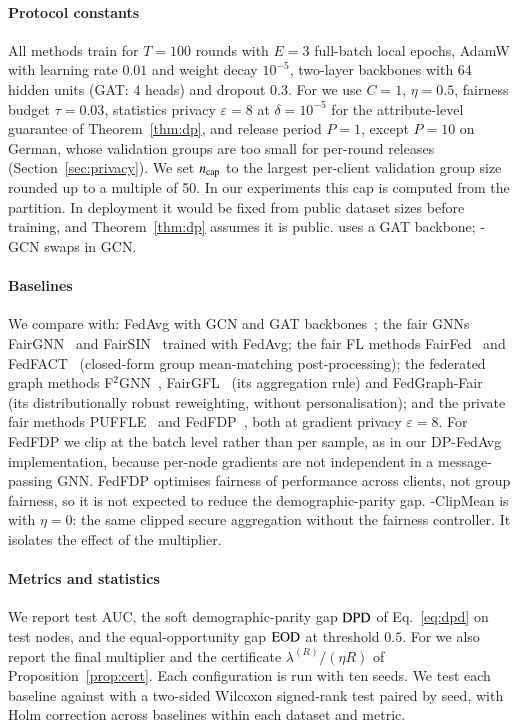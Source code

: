 \paragraph{Protocol constants}
All methods train for $T=100$ rounds with $E=3$ full-batch local epochs, AdamW with learning rate $0.01$ and weight decay $10^{-5}$, two-layer backbones with 64 hidden units (GAT: 4 heads) and dropout $0.3$. For \clamp{} we use $C=1$, $\eta=0.5$, fairness budget $\tau=0.03$, statistics privacy $\varepsilon=8$ at $\delta=10^{-5}$ for the attribute-level guarantee of Theorem~\ref{thm:dp}, and release period $P=1$, except $P=10$ on German, whose validation groups are too small for per-round releases (Section~\ref{sec:privacy}). We set $n_{\mathrm{cap}}$ to the largest per-client validation group size rounded up to a multiple of 50. In our experiments this cap is computed from the partition. In deployment it would be fixed from public dataset sizes before training, and Theorem~\ref{thm:dp} assumes it is public. \clamp{} uses a GAT backbone; \clamp{}-GCN swaps in GCN.

\paragraph{Baselines}
We compare with: FedAvg with GCN and GAT backbones~\citep{mcmahan2017communication}; the fair GNNs FairGNN~\citep{dai2021say} and FairSIN~\citep{yang2024fairsin} trained with FedAvg; the fair FL methods FairFed~\citep{ezzeldin2023fairfed} and FedFACT~\citep{fedfact2025} (closed-form group mean-matching post-processing); the federated graph methods F$^2$GNN~\citep{f2gnn2023}, FairGFL~\citep{fairgfl2026} (its aggregation rule) and FedGraph-Fair~\citep{fedgraphfair2026} (its distributionally robust reweighting, without personalisation); and the private fair methods PUFFLE~\citep{corbucci2024puffle} and FedFDP~\citep{ling2024feddp}, both at gradient privacy $\varepsilon=8$. For FedFDP we clip at the batch level rather than per sample, as in our DP-FedAvg implementation, because per-node gradients are not independent in a message-passing GNN. FedFDP optimises fairness of performance across clients, not group fairness, so it is not expected to reduce the demographic-parity gap. \clamp{}-ClipMean is \clamp{} with $\eta=0$: the same clipped secure aggregation without the fairness controller. It isolates the effect of the multiplier.

\paragraph{Metrics and statistics}
We report test AUC, the soft demographic-parity gap $\mathrm{DPD}$ of Eq.~\eqref{eq:dpd} on test nodes, and the equal-opportunity gap $\mathrm{EOD}$ at threshold $0.5$. For \clamp{} we also report the final multiplier and the certificate $\lambda^{(R)}/(\eta R)$ of Proposition~\ref{prop:cert}. Each configuration is run with ten seeds. We test each baseline against \clamp{} with a two-sided Wilcoxon signed-rank test paired by seed, with Holm correction across baselines within each dataset and metric.

